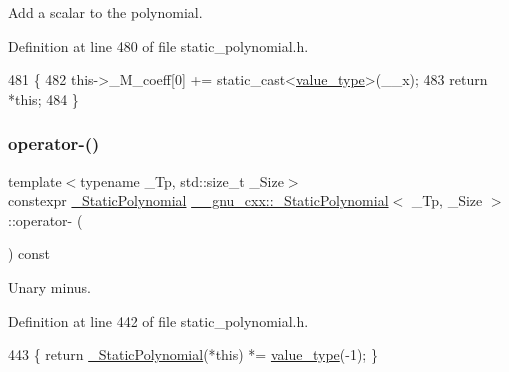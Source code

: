 Add a scalar to the polynomial. 

Definition at line 480 of file static\+\_\+polynomial.\+h.


\begin{DoxyCode}
481       \{
482         this->\_M\_coeff[0] += \textcolor{keyword}{static\_cast<}\hyperlink{class____gnu__cxx_1_1__StaticPolynomial_aad5f3d6d5876b6926b30724aeac649d6}{value\_type}\textcolor{keyword}{>}(\_\_x);
483         \textcolor{keywordflow}{return} *\textcolor{keyword}{this};
484       \}
\end{DoxyCode}
\mbox{\label{class____gnu__cxx_1_1__StaticPolynomial_af5840c98a6a2a89c4e1220e03e68e6ba}} 
\subsubsection{\texorpdfstring{operator-\/()}{operator-()}}
{\footnotesize\ttfamily template$<$typename \+\_\+\+Tp, std\+::size\+\_\+t \+\_\+\+Size$>$ \\
constexpr \hyperlink{class____gnu__cxx_1_1__StaticPolynomial}{\+\_\+\+Static\+Polynomial} \hyperlink{class____gnu__cxx_1_1__StaticPolynomial}{\+\_\+\+\_\+gnu\+\_\+cxx\+::\+\_\+\+Static\+Polynomial}$<$ \+\_\+\+Tp, \+\_\+\+Size $>$\+::operator-\/ (\begin{DoxyParamCaption}{ }\end{DoxyParamCaption}) const\hspace{0.3cm}{\ttfamily [inline]}}

Unary minus. 

Definition at line 442 of file static\+\_\+polynomial.\+h.


\begin{DoxyCode}
443       \{ \textcolor{keywordflow}{return} \hyperlink{class____gnu__cxx_1_1__StaticPolynomial_ab4cec2d98bc20429a2f464ec42a39b71}{\_StaticPolynomial}(*\textcolor{keyword}{this}) *= \hyperlink{class____gnu__cxx_1_1__StaticPolynomial_aad5f3d6d5876b6926b30724aeac649d6}{value\_type}(-1); \}
\end{DoxyCode}
\mbox{\label{class____gnu__cxx_1_1__StaticPolynomial_a8eef582763ba8d005a66d0ebc90a0312}} 

